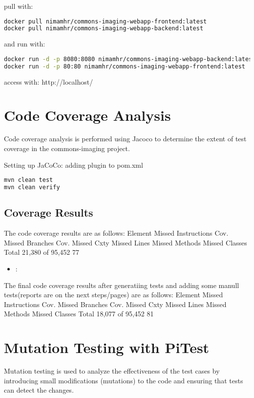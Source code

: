 \documentclass[a4paper,12pt]{report}
\begin{document}
pull with:
\begin{lstlisting}[language=bash]
docker pull nimamhr/commons-imaging-webapp-frontend:latest
docker pull nimamhr/commons-imaging-webapp-backend:latest
\end{lstlisting}

and run with:
\begin{lstlisting}[language=bash]
docker run -d -p 8080:8080 nimamhr/commons-imaging-webapp-backend:latest
docker run -d -p 80:80 nimamhr/commons-imaging-webapp-frontend:latest
\end{lstlisting}

access with:
http://localhost/

\newpage

\chapter{Code Coverage Analysis}
Code coverage analysis is performed using Jacoco to determine the extent of test coverage in the commons-imaging project.

Setting up JaCoCo: adding plugin to pom.xml
\begin{lstlisting}[language=bash]
mvn clean test
mvn clean verify
\end{lstlisting}

\section{Coverage Results}
The code coverage results are as follows:
Element Missed Instructions Cov.	Missed Branches	Cov.	Missed	Cxty	Missed	Lines	Missed	Methods	Missed	Classes
Total	21,380 of 95,452	77%
\begin{itemize}

 \item \textbf{}:
\end{itemize}
The final code coverage results after generatiing tests and adding some manull tests(reports are on the next steps/pages) are as follows:
Element Missed Instructions Cov.	Missed Branches	Cov.	Missed	Cxty	Missed	Lines	Missed	Methods	Missed	Classes
Total	18,077 of 95,452	81%

\newpage

\chapter{Mutation Testing with PiTest}
Mutation testing is used to analyze the effectiveness of the test cases by introducing small modifications (mutations) to the code and ensuring that tests can detect the changes.
\end{document}
